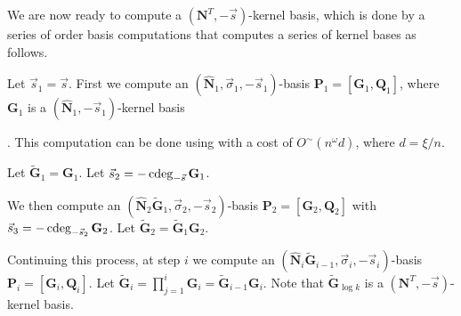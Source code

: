 We are now ready to compute a $\left(\mathbf{N}^{T},-\vec{s}\right)$-kernel
basis, which is done by a series of order basis computations that
computes a series of kernel bases as follows.

Let $\vec{s}_{1}=\vec{s}$. First we compute an $\left(\hat{\mathbf{N}}_{1},\vec{\sigma}_{1},-\vec{s}_{1}\right)$-basis
$\mathbf{P}_{1}=\left[\mathbf{G}_{1},\mathbf{Q}_{1}\right]$, where
$\mathbf{G}_{1}$ is a $\left(\hat{\mathbf{N}}_{1},-\vec{s}_{1}\right)$-kernel
basis%
\begin{comment}
 with $\cdeg_{-\vec{s}_{1}}\mathbf{N}_{1}\le0$
\end{comment}
. This computation can be done using  with a
cost of $O^{\sim}\left(n^{\omega}d\right)$, where $d=\xi/n$. 

Let $\tilde{\mathbf{G}}_{1}=\mathbf{G}_{1}$. Let $\vec{s}_{2}=-\cdeg_{-\vec{s}}\mathbf{G}_{1}$.
\begin{comment}
Note that $-\vec{s}_{1}\le-[\vec{s}_{2},\vec{t}_{2}]\le\left[0,\dots,0,1,\dots1\right]$
component-wise, since $\mathbf{P}_{1}$ has lower order than any $\left(\mathbf{M}^{T},\vec{b}+\left[1,\dots,1\right],-\vec{s}\right)$-basis
$\mathbf{P}$ hence generates $\mathbf{P}$. Therefore, $\cdeg_{-\vec{s}}\mathbf{P}_{1}\le\cdeg_{-\vec{s}}\mathbf{P}\le\left[0,\dots,0,1,\dots1\right]$. 
\end{comment}
{} We then compute an $\left(\hat{\mathbf{N}}_{2}\tilde{\mathbf{G}}_{1},\vec{\sigma}_{2},-\vec{s}_{2}\right)$-basis
$\mathbf{P}_{2}=\left[\mathbf{G}_{2},\mathbf{Q}_{2}\right]$ with
$\vec{s}_{3}=-\cdeg_{-\vec{s}_{2}}\mathbf{G}_{2}$. Let $\tilde{\mathbf{G}}_{2}=\tilde{\mathbf{G}}_{1}\mathbf{G}_{2}$.
\begin{comment}
Let $\mathbf{R}_{1}=\left[\mathbf{N}_{1}\mathbf{Q}_{2},\mathbf{Q}_{1}\right]$
and $\mathbf{R}_{1}^{r}=\revCol\left(\mathbf{R}_{1},-\vec{s},\cdeg_{-\vec{s}}\mathbf{R}_{1}\right)$.
Then from \prettyref{lem:unimodularComputationByRows} we know $\left[\mathbf{F}^{T},\mathbf{R}_{1}^{r}\right]$
is a unimodular matrix.
\end{comment}


Continuing this process, at step $i$ we compute an $\left(\hat{\mathbf{N}}_{i}\tilde{\mathbf{G}}_{i-1},\vec{\sigma}_{i},-\vec{s}_{i}\right)$-basis
$\mathbf{P}_{i}=\left[\mathbf{G}_{i},\mathbf{Q}_{i}\right]$. Let
$\tilde{\mathbf{G}}_{i}=\prod_{j=1}^{i}\mathbf{G}_{i}=\tilde{\mathbf{G}}_{i-1}\mathbf{G}_{i}$.
Note that $\tilde{\mathbf{G}}_{\log k}$ is a $\left(\mathbf{N}^{T},-\vec{s}\right)$-kernel
basis. 

